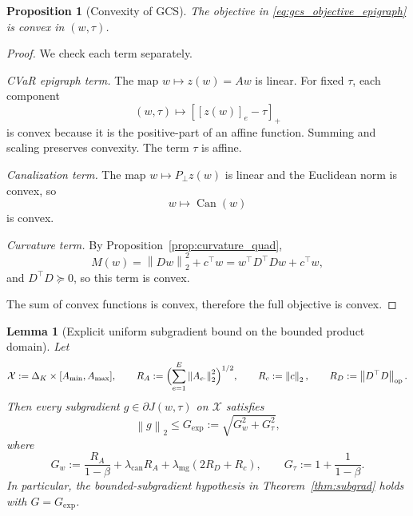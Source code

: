 \documentclass[11pt]{article}
\newcommand{\1}{\mathbf{1}}
\newcommand{\norm}[1]{\left\lVert #1 \right\rVert}
\newcommand{\Dset}{\Delta_K}
\newcommand{\Pperp}{P_\perp}
\theoremstyle{plain}
\newtheorem{proposition}[theorem]{Proposition}
\newtheorem{lemma}[theorem]{Lemma}
\theoremstyle{definition}
\theoremstyle{remark}
\begin{document}
\begin{proposition}[Convexity of GCS]\label{prop:convex}
The objective in \eqref{eq:gcs_objective_epigraph} is convex in $(w,\tau)$.
\end{proposition}

\begin{proof}
We check each term separately.

\emph{CVaR epigraph term.} The map $w \mapsto z(w)=Aw$ is linear. For fixed $\tau$, each component
\[
(w,\tau) \mapsto [[z(w)]_e - \tau]_+
\]
is convex because it is the positive-part of an affine function. Summing and scaling preserves convexity. The term $\tau$ is affine.

\emph{Canalization term.} The map $w \mapsto \Pperp z(w)$ is linear and the Euclidean norm is convex, so
\[
w \mapsto \operatorname{Can}(w)
\]
is convex.

\emph{Curvature term.} By Proposition~\ref{prop:curvature_quad},
\[
M(w)=\norm{Dw}_2^2 + c^\top w = w^\top D^\top D w + c^\top w,
\]
and $D^\top D \succeq 0$, so this term is convex.

The sum of convex functions is convex, therefore the full objective is convex.
\end{proof}


\begin{lemma}[Explicit uniform subgradient bound on the bounded product domain]\label{lem:subgrad_bound}
Let
\[
\mathcal{X}:=\Dset\times[A_{\min},A_{\max}],
\qquad
R_A:=\Bigl(\sum_{e=1}^E \norm{A_{e\cdot}}_2^2\Bigr)^{1/2},
\qquad
R_c:=\norm{c}_2,
\qquad
R_D:=\norm{D^\top D}_{\mathrm{op}}.
\]
Then every subgradient $g\in\partial J(w,\tau)$ on $\mathcal{X}$ satisfies
\[
\norm{g}_2 \le G_{\mathrm{exp}} := \sqrt{G_w^2 + G_\tau^2},
\]
where
\[
G_w := \frac{R_A}{1-\beta} + \lambda_{\mathrm{can}}R_A + \lambda_{\mathrm{mg}}(2R_D+R_c),
\qquad
G_\tau := 1 + \frac{1}{1-\beta}.
\]
In particular, the bounded-subgradient hypothesis in Theorem~\ref{thm:subgrad} holds with $G=G_{\mathrm{exp}}$.
\end{lemma}
\end{document}
